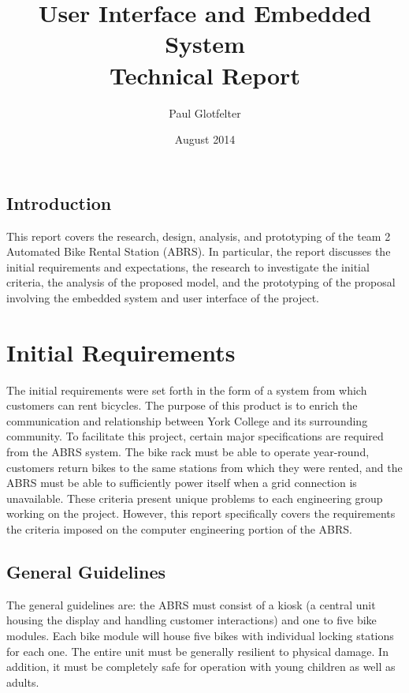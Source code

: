 \documentclass[11pt,a4paper,onesides]{report}
\begin{document}
\title{User Interface and Embedded System  \\ Technical Report}
\author{Paul Glotfelter}
\date{August 2014}

\maketitle

\tableofcontents


\renewcommand{\chaptername}{Section}

\section*{Introduction}

This report covers the research, design, analysis, and prototyping of the team 2 Automated Bike Rental Station (ABRS).  In particular, the report discusses the initial requirements and expectations, the research to investigate the initial criteria, the analysis of the proposed model, and the prototyping of the proposal involving the embedded system and user interface of the project.  

\chapter{Initial Requirements}

The initial requirements were set forth in the form of a system from which customers can rent bicycles.  The purpose of this product is to enrich the communication and relationship between York College and its surrounding community.  To facilitate this project, certain major specifications are required from the ABRS system.  The bike rack must be able to operate year-round, customers return bikes to the same stations from which they were rented, and the ABRS must be able to sufficiently power itself when a grid connection is unavailable.  These criteria present unique problems to each engineering group working on the project.  However, this report specifically covers the requirements the criteria imposed on the computer engineering portion of the ABRS.  

\section{General Guidelines}

The general guidelines are: the ABRS must consist of a kiosk (a central unit housing the display and handling customer interactions) and one to five bike modules.  Each bike module will house five bikes with individual locking stations for each one.  The entire unit must be generally resilient to physical damage.  In addition, it must be completely safe for operation with young children as well as adults.    
\end{document}
